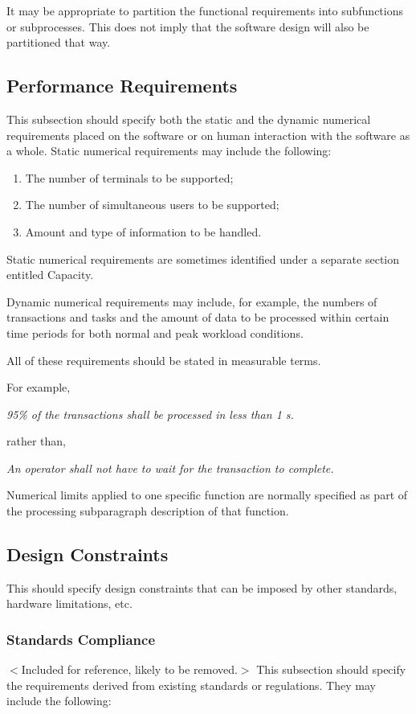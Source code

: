 \documentclass[draftclsnofoot,onecolumn,10pt]{IEEEtran}
\begin{document}
It may be appropriate to partition the functional requirements into subfunctions
or subprocesses. This does not imply that the software design will also be
partitioned that way.

\subsection{Performance Requirements}
This subsection should specify both the static and the dynamic numerical
requirements placed on the software or on human interaction with the software as
a whole. Static numerical requirements may include the following:

\begin{enumerate}
	\item The number of terminals to be supported;
	\item The number of simultaneous users to be supported;
	\item Amount and type of information to be handled.
\end{enumerate}

Static numerical requirements are sometimes identified under a separate section
entitled Capacity.

Dynamic numerical requirements may include, for example, the numbers of
transactions and tasks and the amount of data to be processed within certain
time periods for both normal and peak workload conditions.

All of these requirements should be stated in measurable terms.

For example,

\textit{95\% of the transactions shall be processed in less than 1 s.}

rather than,

\textit{An operator shall not have to wait for the transaction to complete.}

Numerical limits applied to one specific function are normally specified as part
of the processing subparagraph description of that function.

\subsection{Design Constraints}
This should specify design constraints that can be imposed by other standards,
hardware limitations, etc.

\subsubsection{Standards Compliance}
$<$Included for reference, likely to be removed.$>$
This subsection should specify the requirements derived from existing standards
or regulations. They may include the following:
\end{document}
